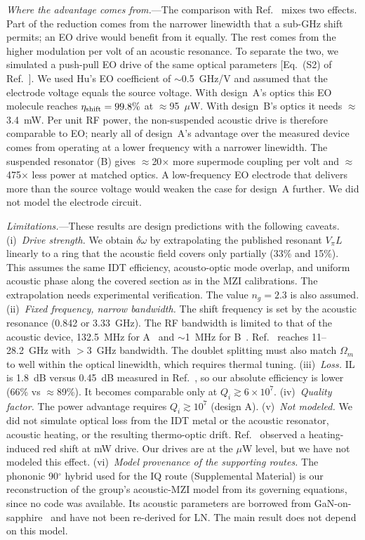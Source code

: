 \documentclass[aps,prl,reprint,superscriptaddress,amsmath,amssymb,floatfix]{revtex4-2}
\newcommand{\etash}{\eta_{\rm shift}}
\begin{document}
\emph{Where the advantage comes from.}---The comparison with Ref.~\cite{Hu2021} mixes two effects. Part of the reduction comes from the narrower linewidth that a sub-GHz shift permits; an EO drive would benefit from it equally. The rest comes from the higher modulation per volt of an acoustic resonance. To separate the two, we simulated a push-pull EO drive of the same optical parameters [Eq.~(S2) of Ref.~\cite{Hu2021}]. We used Hu's EO coefficient of $\sim$0.5~GHz/V and assumed that the electrode voltage equals the source voltage. With design~A's optics this EO molecule reaches $\etash=99.8\%$ at $\approx$95~$\mu$W. With design~B's optics it needs $\approx$3.4~mW. Per unit RF power, the non-suspended acoustic drive is therefore comparable to EO; nearly all of design~A's advantage over the measured device comes from operating at a lower frequency with a narrower linewidth. The suspended resonator (B) gives $\approx$20$\times$ more supermode coupling per volt and $\approx$475$\times$ less power at matched optics. A low-frequency EO electrode that delivers more than the source voltage would weaken the case for design~A further. We did not model the electrode circuit.

\emph{Limitations.}---These results are design predictions with the following caveats.
(i)~\emph{Drive strength.} We obtain $\delta\omega$ by extrapolating the published resonant $V_\pi L$~\cite{Ni2026,Shao2019} linearly to a ring that the acoustic field covers only partially (33\% and 15\%). This assumes the same IDT efficiency, acousto-optic mode overlap, and uniform acoustic phase along the covered section as in the MZI calibrations. The extrapolation needs experimental verification. The value $n_g=2.3$ is also assumed.
(ii)~\emph{Fixed frequency, narrow bandwidth.} The shift frequency is set by the acoustic resonance (0.842 or 3.33~GHz). The RF bandwidth is limited to that of the acoustic device, 132.5~MHz for A~\cite{Ni2026} and $\sim$1~MHz for B~\cite{Shao2019}. Ref.~\cite{Hu2021} reaches 11--28.2~GHz with $>3$~GHz bandwidth. The doublet splitting must also match $\Omega_m$ to well within the optical linewidth, which requires thermal tuning.
(iii)~\emph{Loss.} IL is 1.8~dB versus 0.45~dB measured in Ref.~\cite{Hu2021}, so our absolute efficiency is lower (66\% vs $\approx$89\%). It becomes comparable only at $Q_i\gtrsim6\times10^7$.
(iv)~\emph{Quality factor.} The power advantage requires $Q_i\gtrsim10^7$ (design A).
(v)~\emph{Not modeled.} We did not simulate optical loss from the IDT metal or the acoustic resonator, acoustic heating, or the resulting thermo-optic drift. Ref.~\cite{Shao2019} observed a heating-induced red shift at mW drive. Our drives are at the $\mu$W level, but we have not modeled this effect.
(vi)~\emph{Model provenance of the supporting routes.} The phononic 90$^\circ$ hybrid used for the IQ route (Supplemental Material) is our reconstruction of the group's acoustic-MZI model from its governing equations, since no code was available. Its acoustic parameters are borrowed from GaN-on-sapphire~\cite{Xu2025} and have not been re-derived for LN. The main result does not depend on this model.
\end{document}
